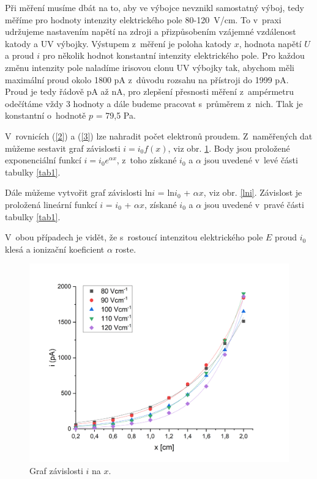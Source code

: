 \documentclass[a4paper,12pt]{article}
\begin{document}
Při měření musíme dbát na to, aby ve výbojce nevznikl samostatný výboj, tedy měříme pro hodnoty intenzity elektrického pole 80-120~V/cm. To v~praxi udržujeme nastavením napětí na zdroji a přizpůsobením vzájemné vzdálenost katody a UV výbojky. Výstupem z~měření je poloha katody $x$, hodnota napětí $U$ a proud $i$ pro několik hodnot konstantní intenzity elektrického pole. Pro každou změnu intenzity pole naladíme irisovou clonu UV výbojky tak, abychom měli maximální proud okolo 1800 pA z~důvodu rozsahu na přístroji do 1999 pA. Proud je tedy řádově pA až nA, pro zlepšení přesnosti měření z~ampérmetru odečítáme vždy 3 hodnoty a dále budeme pracovat s~průměrem z~nich. Tlak je konstantní o~hodnotě $p$ = 79,5 Pa.

V~rovnicích (\ref{2}) a (\ref{3}) lze nahradit počet elektronů proudem. Z~naměřených dat můžeme sestavit graf závislosti $i = i_0 f(x)$, viz obr. \ref{ifx}. Body jsou proložené exponenciální funkcí $i = i_0 e^{\alpha x}$, z~toho získané $i_0$ a $\alpha$ jsou uvedené v~levé části tabulky \ref{tab1}.

Dále můžeme vytvořit graf závislosti ln$i$ = ln$i_0$ + $\alpha x$, viz obr. \ref{lni}. Závislost je proložená lineární funkcí $i$ = $i_0$ + $\alpha x$, získané $i_0$ a $\alpha$ jsou uvedené v~pravé části tabulky \ref{tab1}.

V~obou případech je vidět, že s~rostoucí intenzitou elektrického pole $E$ proud $i_0$ klesá a ionizační koeficient $\alpha$ roste.

\begin{figure}[h!]
	\centering
	\includegraphics[width=145mm]{ifx.png}
	\caption{Graf závislosti $i$ na $x$.}
	\label{ifx}
\end{figure}
\end{document}
